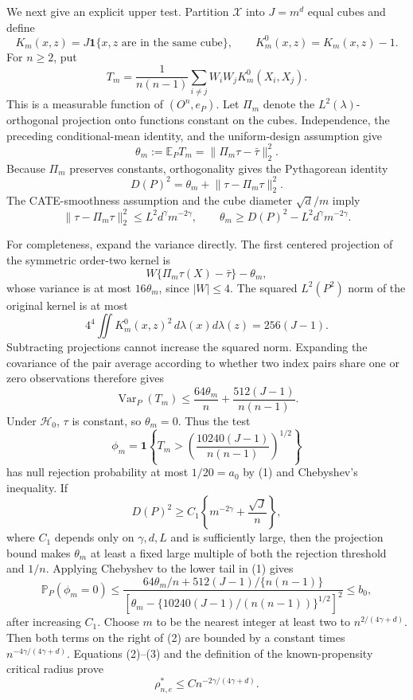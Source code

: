 We next give an explicit upper test. Partition \(\mathcal X\) into \(J=m^d\) equal cubes and define
\[
 K_m(x,z)=J\mathbf 1\{x,z\text{ are in the same cube}\},
 \qquad K_m^0(x,z)=K_m(x,z)-1.
\]
For \(n\ge2\), put
\[
 T_m=\frac1{n(n-1)}\sum_{i\ne j}W_iW_jK_m^0(X_i,X_j).
\]
This is a measurable function of \((O^n,e_P)\). Let \(\Pi_m\) denote the \(L^2(\lambda)\)-orthogonal projection onto functions constant on the cubes. Independence, the preceding conditional-mean identity, and the uniform-design assumption give
\[
 \theta_m:=\mathbb E_PT_m
 =\lVert\Pi_m\tau-\bar\tau\rVert_2^2.
\]
Because \(\Pi_m\) preserves constants, orthogonality gives the Pythagorean identity
\[
 D(P)^2=\theta_m+\lVert\tau-\Pi_m\tau\rVert_2^2.
\]
The CATE-smoothness assumption and the cube diameter \(\sqrt d/m\) imply
\[
 \lVert\tau-\Pi_m\tau\rVert_2^2
 \le L^2d^\gamma m^{-2\gamma},
 \qquad
 \theta_m\ge D(P)^2-L^2d^\gamma m^{-2\gamma}.
\]

For completeness, expand the variance directly. The first centered projection of the symmetric order-two kernel is
\[
 W\{\Pi_m\tau(X)-\bar\tau\}-\theta_m,
\]
whose variance is at most \(16\theta_m\), since \(|W|\le4\). The squared \(L^2(P^2)\) norm of the original kernel is at most
\[
 4^4\iint K_m^0(x,z)^2\,d\lambda(x)d\lambda(z)
 =256(J-1).
\]
Subtracting projections cannot increase the squared norm. Expanding the covariance of the pair average according to whether two index pairs share one or zero observations therefore gives
\[
 \operatorname{Var}_P(T_m)
 \le \frac{64\theta_m}{n}
      +\frac{512(J-1)}{n(n-1)}.                                      \tag{1}
\]
Under \(\mathcal H_0\), \(\tau\) is constant, so \(\theta_m=0\). Thus the test
\[
 \phi_m=\mathbf 1\!\left\{T_m>
 \left(\frac{10240(J-1)}{n(n-1)}\right)^{1/2}\right\}
\]
has null rejection probability at most \(1/20=a_0\) by (1) and Chebyshev's inequality. If
\[
 D(P)^2\ge C_1\left\{m^{-2\gamma}+\frac{\sqrt J}{n}\right\},          \tag{2}
\]
where \(C_1\) depends only on \(\gamma,d,L\) and is sufficiently large, then the projection bound makes \(\theta_m\) at least a fixed large multiple of both the rejection threshold and \(1/n\). Applying Chebyshev to the lower tail in (1) gives
\[
 \mathbb P_P(\phi_m=0)
 \le
 \frac{64\theta_m/n+512(J-1)/\{n(n-1)\}}
 {\left[\theta_m-\{10240(J-1)/(n(n-1))\}^{1/2}\right]^2}
 \le b_0,                                                            \tag{3}
\]
after increasing \(C_1\). Choose \(m\) to be the nearest integer at least two to \(n^{2/(4\gamma+d)}\). Then both terms on the right of (2) are bounded by a constant times \(n^{-4\gamma/(4\gamma+d)}\). Equations (2)--(3) and the definition of the known-propensity critical radius prove
\[
 \rho_{n,e}^*\le C n^{-2\gamma/(4\gamma+d)}.                          \tag{4}
\]

